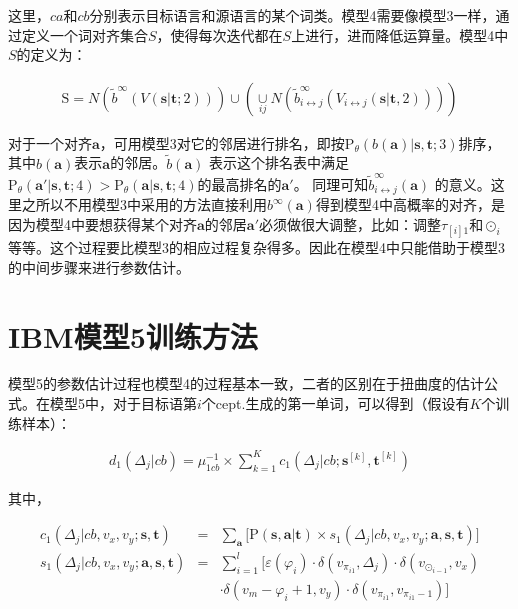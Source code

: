 \begin{appendices}
\noindent 这里，$ca$和$cb$分别表示目标语言和源语言的某个词类。模型4需要像模型3一样，通过定义一个词对齐集合$S$，使得每次迭代都在$S$上进行，进而降低运算量。模型4中$S$的定义为：

\begin{eqnarray}
\textrm{S} = N(\tilde{b}^{\infty}(V(\mathbf{s}|\mathbf{t};2))) \cup (\mathop{\cup}\limits_{ij} N(\tilde{b}_{i \leftrightarrow j}^{\infty}(V_{i \leftrightarrow j}(\mathbf{s}|\mathbf{t},2))))
\label{eq:1.22}
\end{eqnarray}

\parinterval 对于一个对齐$\mathbf{a}$，可用模型3对它的邻居进行排名，即按$\textrm{P}_{\theta}(b(\mathbf{a})|\mathbf{s},\mathbf{t};3)$排序，其中$b(\mathbf{a})$表示$\mathbf{a}$的邻居。$\tilde{b}(\mathbf{a})$ 表示这个排名表中满足$\textrm{P}_{\theta}(\mathbf{a}'|\mathbf{s},\mathbf{t};4) > \textrm{P}_{\theta}⁡(\mathbf{a}|\mathbf{s},\mathbf{t};4)$的最高排名的$\mathbf{a}'$。 同理可知$\tilde{b}_{i \leftrightarrow j}^{\infty}(\mathbf{a})$ 的意义。这里之所以不用模型3中采用的方法直接利用$b^{\infty}(\mathbf{a})$得到模型4中高概率的对齐，是因为模型4中要想获得某个对齐$\mathbf{a}$的邻居$\mathbf{a}'$必须做很大调整，比如：调整$\tau_{[i]1}$和$\odot_{i}$等等。这个过程要比模型3的相应过程复杂得多。因此在模型4中只能借助于模型3的中间步骤来进行参数估计。
\setlength{\belowdisplayskip}{3pt}%


\section{IBM模型5训练方法}
\parinterval 模型5的参数估计过程也模型4的过程基本一致，二者的区别在于扭曲度的估计公式。在模型5中，对于目标语第$i$个cept.生成的第一单词，可以得到（假设有$K$个训练样本）：

\begin{eqnarray}
d_1(\Delta_j|cb) = \mu_{1cb}^{-1} \times \sum_{k=1}^{K}c_1(\Delta_j|cb;\mathbf{s}^{[k]},\mathbf{t}^{[k]})
\label{eq:1.23}
\end{eqnarray}

其中，

\begin{eqnarray}
c_1(\Delta_j|cb,v_x,v_y;\mathbf{s},\mathbf{t})                   & = & \sum_{\mathbf{a}}\Big[ \textrm{P}(\mathbf{s},\mathbf{a}|\mathbf{t}) \times s_1(\Delta_j|cb,v_x,v_y;\mathbf{a},\mathbf{s},\mathbf{t}) \Big] \label{eq:1.24} \\
s_1(\Delta_j|cb,v_x,v_y;\mathbf{a},\mathbf{s},\mathbf{t}) & = & \sum_{i=1}^l \Big [ \varepsilon(\varphi_i) \cdot \delta(v_{\pi_{i1}},\Delta_j) \cdot \delta(v_{\odot _{i-1}},v_x) \nonumber \\
                                                                                          &    & \cdot \delta(v_m-\varphi_i+1,v_y) \cdot \delta(v_{\pi_{i1}},v_{\pi_{i1}-1} )\Big] \label{eq:1.25}
\end{eqnarray}



\end{appendices}
